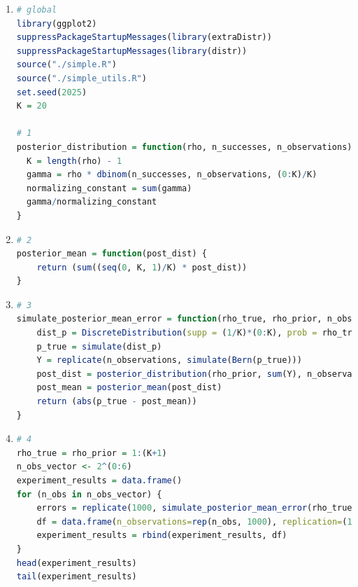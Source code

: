 \documentclass{article}
\begin{document}
\begin{enumerate}
\item 
\begin{lstlisting}[language=R]
# global
library(ggplot2)
suppressPackageStartupMessages(library(extraDistr))
suppressPackageStartupMessages(library(distr))
source("./simple.R")
source("./simple_utils.R")
set.seed(2025)
K = 20

# 1
posterior_distribution = function(rho, n_successes, n_observations) {
  K = length(rho) - 1
  gamma = rho * dbinom(n_successes, n_observations, (0:K)/K)
  normalizing_constant = sum(gamma)
  gamma/normalizing_constant
}
\end{lstlisting}


\item 
\begin{lstlisting}[language=R]
# 2
posterior_mean = function(post_dist) {
    return (sum((seq(0, K, 1)/K) * post_dist))
}
\end{lstlisting}

\item 
\begin{lstlisting}[language=R]
# 3
simulate_posterior_mean_error = function(rho_true, rho_prior, n_observations){
    dist_p = DiscreteDistribution(supp = (1/K)*(0:K), prob = rho_true/sum(rho_true))
    p_true = simulate(dist_p)
    Y = replicate(n_observations, simulate(Bern(p_true)))
    post_dist = posterior_distribution(rho_prior, sum(Y), n_observations)
    post_mean = posterior_mean(post_dist)
    return (abs(p_true - post_mean))
}
\end{lstlisting}

\item 
\begin{lstlisting}[language=R]
# 4
rho_true = rho_prior = 1:(K+1)
n_obs_vector <- 2^(0:6)
experiment_results = data.frame()
for (n_obs in n_obs_vector) {
    errors = replicate(1000, simulate_posterior_mean_error(rho_true, rho_prior, n_obs))
    df = data.frame(n_observations=rep(n_obs, 1000), replication=(1:1000), errors=errors)
    experiment_results = rbind(experiment_results, df)
}
head(experiment_results)
tail(experiment_results)
\end{lstlisting}



\end{enumerate}
\end{document}
